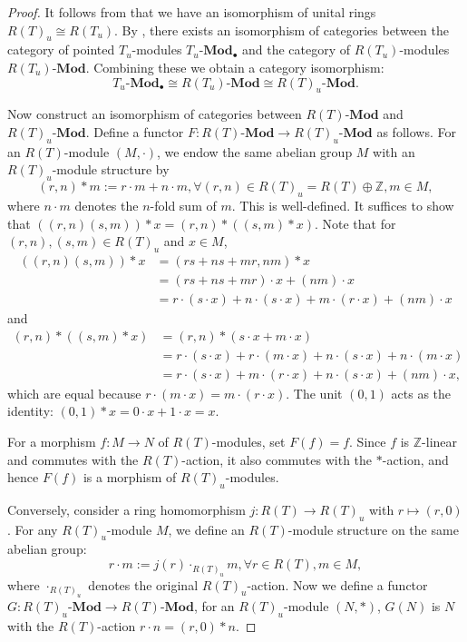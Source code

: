 \documentclass[11pt, twoside]{article}
\begin{document}
\begin{proof}
{It follows from \cite[Proposition 2.11]{mb} that we have an isomorphism of unital rings $R(T)_u \cong R(T_u)$. By \cite[Theorem 3.1]{mb}, there exists an isomorphism of categories between the category of pointed $T_u$-modules $T_u\textbf{-Mod}_{\bullet}$ and the category of $R(T_u)$-modules $R(T_u)\textbf{-Mod}$. Combining these we obtain a category isomorphism:
$$T_u\textbf{-Mod}_{\bullet} \cong R(T_u)\textbf{-Mod} \cong R(T)_u\textbf{-Mod}.$$

Now construct an isomorphism of categories between $R(T)\textbf{-Mod}$ and $R(T)_u\textbf{-Mod}$.
Define a functor $F: R(T)\textbf{-Mod} \rightarrow R(T)_u\textbf{-Mod}$ as follows. For an $R(T)$-module $(M, \cdot)$, we endow the same abelian group $M$ with an $R(T)_u$-module structure by
$$ (r, n) \ast m := r \cdot m + n \cdot m, \forall (r, n) \in R(T)_u = R(T) \oplus \mathbb{Z}, m \in M, $$
where $n \cdot m$ denotes the $n$-fold sum of $m$. This is well-defined. It suffices to show that $((r, n)(s, m)) \ast x = (r, n) \ast ((s, m) \ast x) $. Note that for $(r, n), (s, m) \in R(T)_u$ and $x \in M$,
\begin{align*}
((r, n)(s, m)) \ast x &= (rs + ns + mr, nm) \ast x \\
&= (rs + ns + mr) \cdot x + (nm) \cdot x \\
&= r \cdot (s \cdot x) + n \cdot (s \cdot x) + m \cdot (r \cdot x) + (nm) \cdot x
\end{align*}
and
\begin{align*}
(r, n) \ast ((s, m) \ast x) &= (r, n) \ast (s \cdot x + m \cdot x) \\
&= r \cdot (s \cdot x) + r \cdot (m \cdot x) + n \cdot (s \cdot x) + n \cdot (m \cdot x) \\
&= r \cdot (s \cdot x) + m \cdot (r \cdot x) + n \cdot (s \cdot x) + (nm) \cdot x,
\end{align*}
which are equal because $r \cdot (m \cdot x) = m \cdot (r \cdot x)$. The unit $(0,1)$ acts as the identity: $(0,1) \ast x = 0 \cdot x + 1 \cdot x = x$.

For a morphism $f: M \to N$ of $R(T)$-modules, set $F(f) = f$. Since $f$ is $\mathbb{Z}$-linear and commutes with the $R(T)$-action, it also commutes with the $\ast$-action, and hence $F(f)$ is a morphism of $R(T)_u$-modules.

Conversely, consider a ring homomorphism $j: R(T) \rightarrow R(T)_u$ with $r\mapsto (r,0)$. For any $R(T)_u$-module $M$, we define an $R(T)$-module structure on the same abelian group:
$$ r \cdot m := j(r) \cdot_{R(T)_u} m, \forall r \in R(T), m \in M,$$
where $\cdot_{R(T)_u}$ denotes the original $R(T)_u$-action. Now we define a functor $G: R(T)_u\textbf{-Mod} \rightarrow R(T)\textbf{-Mod}$, for an $R(T)_u$-module $(N, \ast)$, $G(N)$ is $N$ with the $R(T)$-action $r \cdot n = (r, 0) \ast n$.

}
\end{proof}
\end{document}
